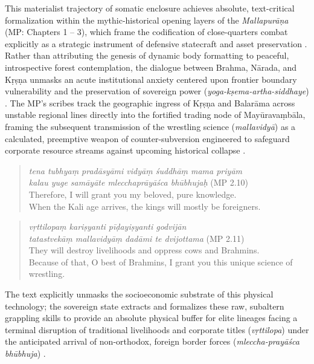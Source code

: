 \documentclass[11pt,twoside,letterpaper]{article}
\begin{document}
This materialist trajectory of somatic enclosure achieves absolute, text-critical formalization within the mythic-historical opening layers of the \textit{Mallapurāṇa} (MP: Chapters 1 -- 3), which frame the codification of close-quarters combat explicitly as a strategic instrument of defensive statecraft and asset preservation \citep{MP_7}. Rather than attributing the genesis of dynamic body formatting to peaceful, introspective forest contemplation, the dialogue between Brahma, Nārada, and Kṛṣṇa unmasks an acute institutional anxiety centered upon frontier boundary vulnerability and the preservation of sovereign power (\textit{yoga-kṣema-artha-siddhaye}) \citep{MP_7}. The MP's scribes track the geographic ingress of Kṛṣṇa and Balarāma across unstable regional lines directly into the fortified trading node of Mayūravaṃbāla, framing the subsequent transmission of the wrestling science (\textit{mallavidyā}) as a calculated, preemptive weapon of counter-subversion engineered to safeguard corporate resource streams against upcoming historical collapse \citep{MP_7, russell2025, rochard2023,  soral2025}.

\begin{quote}
\textit{tena tubhyaṃ pradāsyāmi vidyāṃ śuddhāṃ mama priyām } \\
\textit{kalau yuge samāyāte mlecchaprāyāśca bhūbhujaḥ} (MP 2.10)  \\
Therefore, I will grant you my beloved, pure knowledge. \\
When the Kali age arrives, the kings will mostly be foreigners. \\
\end{quote}

\begin{quote}  
\textit{vṛttilopaṃ kariṣyanti pīḍayiṣyanti godvijān} \\
\textit{tatastvekāṃ mallavidyāṃ dadāmi te dvijottama} (MP 2.11) \\
They will destroy livelihoods and oppress cows and Brahmins. \\
Because of that, O best of Brahmins, I grant you this unique science of wrestling.\\
\end{quote}

The text explicitly unmasks the socioeconomic substrate of this physical technology; the sovereign state extracts and formalizes these raw, subaltern grappling skills to provide an absolute physical buffer for elite lineages facing a terminal disruption of traditional livelihoods and corporate titles (\textit{vṛttilopa}) under the anticipated arrival of non-orthodox, foreign border forces (\textit{mleccha-prayāśca bhūbhuja}) \citep{MP_7}. 
\end{document}
